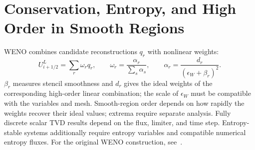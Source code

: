 \section{Conservation, Entropy, and High Order in Smooth Regions}
WENO combines candidate reconstructions $q_r$ with nonlinear weights:
\[
U_{i+1/2}^{L}=\sum_r\omega_rq_r,\qquad
\omega_r=\frac{\alpha_r}{\sum_s\alpha_s},\qquad
\alpha_r=\frac{d_r}{(\epsilon_W+\beta_r)^2}.
\]
$\beta_r$ measures stencil smoothness and $d_r$ gives the ideal weights of the corresponding high-order linear combination;
the scale of $\epsilon_W$ must be compatible with the variables and mesh.
Smooth-region order depends on how rapidly the weights recover their ideal values; extrema require separate analysis.
Fully discrete scalar TVD results depend on the flux, limiter, and time step.
Entropy-stable systems additionally require entropy variables and compatible numerical entropy fluxes. For the original WENO construction, see~\cite{jiang1996}.
